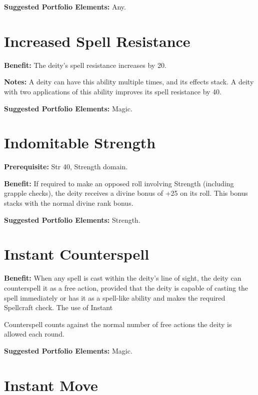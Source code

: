 \documentclass{article}
\begin{document}
\textbf{Suggested Portfolio Elements:} Any.

\vspace{12pt}
\section*{Increased Spell Resistance}

\textbf{Benefit:} The deity's spell resistance increases by 20.

\textbf{Notes:} A deity can have this ability multiple times, and its effects stack. 
A deity with two applications of this ability improves its spell resistance by 
40.

\textbf{Suggested Portfolio Elements:} Magic.

\vspace{12pt}
\section*{Indomitable Strength}

\textbf{Prerequisite:} Str 40, Strength domain.

\textbf{Benefit:} If required to make an opposed roll involving Strength (including 
grapple checks), the deity receives a divine bonus of +25 on its roll. This bonus 
stacks with the normal divine rank bonus.

\textbf{Suggested Portfolio Elements:} Strength.

\vspace{12pt}
\section*{Instant Counterspell}

\textbf{Benefit:} When any spell is cast within the deity's line of sight, the 
deity can counterspell it as a free action, provided that the deity is capable 
of casting the spell immediately or has it as a spell-like ability and makes the 
required Spellcraft check. The use of Instant

Counterspell counts against the normal number of free actions the deity is allowed 
each round.

\textbf{Suggested Portfolio Elements:} Magic.

\vspace{12pt}
\section*{Instant Move}
\end{document}
